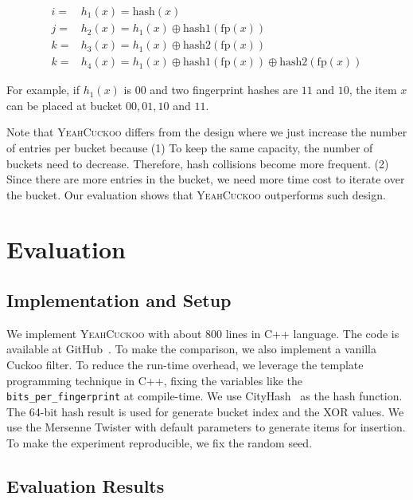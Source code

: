 \documentclass[11pt]{IEEEtran}
\newcommand{\sys}{\textsc{YeahCuckoo}\xspace}
\begin{document}
\begin{equation*}
\begin{split}
i =& h_1(x) = \text{hash}(x) \\
j =& h_2(x) = h_1(x) \oplus \text{hash1}(\text{fp}(x))\\
k =& h_3(x) = h_1(x) \oplus \text{hash2}(\text{fp}(x)) \\
k =& h_4(x) = h_1(x) \oplus \text{hash1}(\text{fp}(x)) \oplus \text{hash2}(\text{fp}(x))
\end{split}
\end{equation*}

For example, if $h_1(x)$ is 00 and two fingerprint hashes are $11$ and $10$, the item $x$ can be placed at bucket $00, 01,10$ and $11$. 

Note that \sys differs from the design where we just increase the number of entries per bucket because (1) To keep the same capacity, the number of buckets need to decrease. Therefore, hash collisions become more frequent. (2) Since there are more entries in the bucket, we need more time cost to iterate over the bucket. Our evaluation shows that \sys outperforms such design.

\section{Evaluation}

\subsection{Implementation and Setup}

We implement \sys with about 800 lines in C++ language. The code is available at GitHub~\cite{yeah}. To make the comparison, we also implement a vanilla Cuckoo filter. To reduce the run-time overhead, we leverage the template programming technique in C++, fixing the variables like the \verb|bits_per_fingerprint| at compile-time. We use CityHash~\cite{cityhash} as the hash function. The 64-bit hash result is used for generate bucket index and the XOR values. We use the Mersenne Twister with default parameters to generate items for insertion. To make the experiment reproducible, we fix the random seed. 

\subsection{Evaluation Results}

 
 
\end{document}
